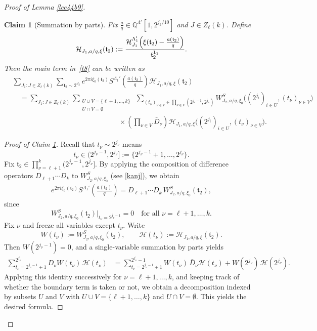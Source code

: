 \documentclass[11 pt,letterpaper]{amsart}
\theoremstyle{plain}
\newtheorem{claim}{Claim}\numberwithin{claim}{section}
\theoremstyle{definition}
\theoremstyle{remark} \theoremstyle{exam} \theoremstyle{ob}
\numberwithin{equation}{section}
\begin{document}
\begin{proof}[Proof of Lemma \ref{lee44b9}]
\begin{claim}[Summation by parts]\label{cl46}
Fix $\frac{a}{q}\in \mathbb{Q}^{\Lambda'}[1,2^{j_k/10}]$ and $J\in Z_\ell(k)$. Define
\begin{align*}
\mathcal{H}_{J_1,a/q,\xi}(\mathfrak{t}_2)
:=
\frac{\mathcal{H}^{\Lambda'_1}_{J_1}\!\left(\xi(\mathfrak{t}_2)-\frac{a(\mathfrak{t}_2)}{q}\right)}{\mathfrak{t}_2^{{\bf 1}_2}}.
\end{align*}
Then the main term in~\eqref{t8} can be written as
\begin{align}\label{t9}
&\sum_{J_1:J\in Z_\ell(k)}\sum_{\mathfrak{t}_2\sim 2^{J_2}}
e^{2\pi i \xi_0(\mathfrak{t}_2)}
S^{\Lambda_1'}\!\left(\frac{a(\mathfrak{t}_2)}{q}\right)
\mathcal{H}_{J_1,a/q,\xi}(\mathfrak{t}_2)\nonumber\\
&\quad=
\sum_{J_1:J\in Z_\ell(k)}
\sum_{\substack{U\cup V=\{\ell+1,\dots,k\}\\ U\cap V=\emptyset}}
\ \sum_{(t_\nu)_{\nu\in V}\in \prod_{\nu\in V}(2^{j_\nu-1},2^{j_\nu})}
W^S_{J_2,a/q,\xi_0}\!\big((2^{j_i})_{i\in U},(t_\nu)_{\nu\in V}\big) \\
&\quad\qquad\quad\qquad\quad\qquad\quad\qquad\quad\qquad \times
\left(\prod_{\nu\in V}\bar{D}_\nu\right)
\mathcal{H}_{J_1,a/q,\xi}\!\big((2^{j_i})_{i\in U},(t_\nu)_{\nu\in V}\big).\nonumber
\end{align}
\end{claim}


 

\begin{proof}[Proof of Claim \ref{cl46}]
Recall that $t_\nu\sim 2^{j_\nu}$ means
\[
t_\nu\in (2^{j_\nu-1},2^{j_\nu}]
:=\{2^{j_\nu-1}+1,\dots,2^{j_\nu}\}.
\]
Fix $\mathfrak{t}_2\in \prod_{\nu=\ell+1}^k (2^{j_\nu-1},2^{j_\nu}]$.
By applying the composition of difference operators $D_{\ell+1}\cdots D_k$ to $W^S_{J_2,a/q,\xi_0}$ (see \eqref{kanj}), we obtain
\begin{align*}
e^{2\pi i \xi_0(\mathfrak{t}_2)}
S^{\Lambda_1'}\!\left(\frac{a(\mathfrak{t}_2)}{q}\right)
= D_{\ell+1}\cdots D_k \, W^S_{J_2,a/q,\xi_0}(\mathfrak{t}_2),
\end{align*}
since
\[
W^S_{J_2,a/q,\xi_0}(\mathfrak{t}_2)\Big|_{t_\nu=2^{j_\nu-1}}=0
\quad \text{for all } \nu=\ell+1,\dots,k.
\]
Fix $\nu$ and freeze all variables except $t_\nu$. Write
\[
W(t_\nu):=W^S_{J_2,a/q,\xi_0}(\mathfrak{t}_2),
\qquad
\mathcal{H}(t_\nu):=\mathcal{H}_{J_1,a/q,\xi}(\mathfrak{t}_2).
\]
Then $W(2^{j_\nu-1})=0$, and a single-variable summation by parts yields
\begin{align*}
\sum_{t_\nu=2^{j_\nu-1}+1}^{2^{j_\nu}}
D_\nu W(t_\nu)\,\mathcal{H}(t_\nu)
&=
\sum_{t_\nu=2^{j_\nu-1}+1}^{2^{j_\nu}-1}
W(t_\nu)\,\bar{D}_\nu \mathcal{H}(t_\nu)
+ W(2^{j_\nu})\,\mathcal{H}(2^{j_\nu}).
\end{align*}
Applying this identity successively for $\nu=\ell+1,\dots,k$,
and keeping track of whether the boundary term is taken or not,
we obtain a decomposition indexed by subsets $U$ and $V$ with
$U\cup V=\{\ell+1,\dots,k\}$ and $U\cap V=\emptyset$.
This yields the desired formula.
\end{proof}




\end{proof}
\end{document}
